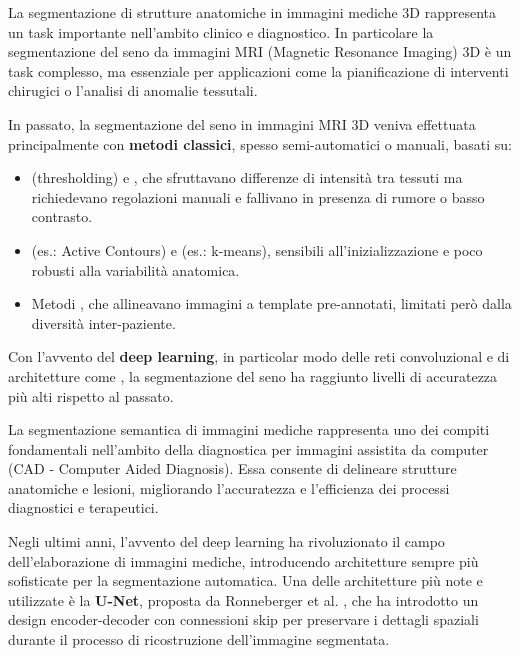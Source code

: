 \documentclass[minted, draw]{../tex/hebdomon}
\begin{document}
\Chapter{}

La segmentazione di strutture anatomiche in immagini mediche 3D rappresenta un task importante nell’ambito clinico e diagnostico. In particolare la segmentazione del seno da immagini MRI (Magnetic Resonance Imaging) 3D è un task complesso, ma essenziale per applicazioni come la pianificazione di interventi chirugici o l’analisi di anomalie tessutali.

In passato, la segmentazione del seno in immagini MRI 3D veniva effettuata principalmente con \textbf{metodi classici}, spesso semi-automatici o manuali, basati su:

\begin{itemize}
	\item {} (thresholding) e , che sfruttavano differenze di intensità tra tessuti ma richiedevano regolazioni manuali e fallivano in presenza di rumore o basso contrasto.
	\item {} (es.: Active Contours) e  (es.: k-means), sensibili all’inizializzazione e poco robusti alla variabilità anatomica.
	\item Metodi , che allineavano immagini a template pre-annotati, limitati però dalla diversità inter-paziente.
\end{itemize}

Con l’avvento del \textbf{deep learning}, in particolar modo delle reti convoluzional e di architetture come , la segmentazione del seno ha raggiunto livelli di accuratezza più alti rispetto al passato. 



La segmentazione semantica di immagini mediche rappresenta uno dei compiti fondamentali nell’ambito della diagnostica per immagini assistita da computer (CAD - Computer Aided Diagnosis). Essa consente di delineare strutture anatomiche e lesioni, migliorando l’accuratezza e l’efficienza dei processi diagnostici e terapeutici.

Negli ultimi anni, l'avvento del deep learning ha rivoluzionato il campo dell’elaborazione di immagini mediche, introducendo architetture sempre più sofisticate per la segmentazione automatica. Una delle architetture più note e utilizzate è la \textbf{U-Net}, proposta da Ronneberger et al. \cite{ronneberger2015unet}, che ha introdotto un design encoder-decoder con connessioni skip per preservare i dettagli spaziali durante il processo di ricostruzione dell'immagine segmentata.
\end{document}
